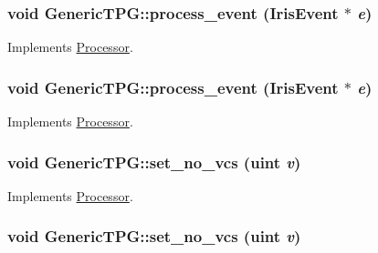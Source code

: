 \hypertarget{classGenericTPG_a2e59f102384206268808835bcb9d5b5}{
\subsubsection[{process\_\-event}]{\setlength{\rightskip}{0pt plus 5cm}void GenericTPG::process\_\-event ({\bf IrisEvent} $\ast$ {\em e})}}
\label{classGenericTPG_a2e59f102384206268808835bcb9d5b5}




Implements \hyperlink{classProcessor_18cdeefafbd8225cb3ad18dd098c0e08}{Processor}.\hypertarget{classGenericTPG_a2e59f102384206268808835bcb9d5b5}{
\subsubsection[{process\_\-event}]{\setlength{\rightskip}{0pt plus 5cm}void GenericTPG::process\_\-event ({\bf IrisEvent} $\ast$ {\em e})}}
\label{classGenericTPG_a2e59f102384206268808835bcb9d5b5}




Implements \hyperlink{classProcessor_18cdeefafbd8225cb3ad18dd098c0e08}{Processor}.\hypertarget{classGenericTPG_e95391a655cacb75ba23e7eb8b3cefef}{
\subsubsection[{set\_\-no\_\-vcs}]{\setlength{\rightskip}{0pt plus 5cm}void GenericTPG::set\_\-no\_\-vcs ({\bf uint} {\em v})}}
\label{classGenericTPG_e95391a655cacb75ba23e7eb8b3cefef}




Implements \hyperlink{classProcessor_3280abfe3637712e09cc651b2d09732e}{Processor}.\hypertarget{classGenericTPG_e95391a655cacb75ba23e7eb8b3cefef}{
\subsubsection[{set\_\-no\_\-vcs}]{\setlength{\rightskip}{0pt plus 5cm}void GenericTPG::set\_\-no\_\-vcs ({\bf uint} {\em v})}}
\label{classGenericTPG_e95391a655cacb75ba23e7eb8b3cefef}




